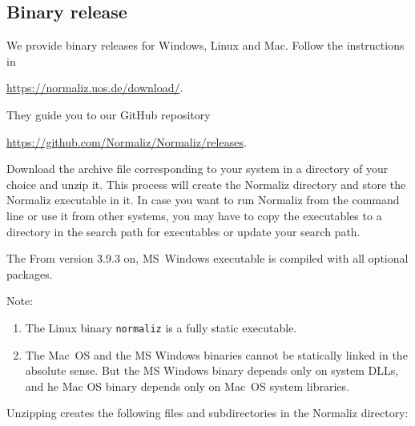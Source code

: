 \subsection{Binary release}\label{binary}

We provide binary releases for Windows, Linux and Mac. Follow the instructions in
\begin{center}
	\url{https://normaliz.uos.de/download/}.
\end{center}
They guide you to our GitHub repository
\begin{center}
	\url{https://github.com/Normaliz/Normaliz/releases}.
\end{center}

Download the archive file
corresponding to your system  in a directory of your choice
and unzip it. This process will create the Normaliz directory and store the Normaliz executable in it. In case you want to run Normaliz from the
command line or use it from other systems, you may have to copy
the executables to a directory in the search path for executables or update your search path.

The From version 3.9.3 on, MS~Windows executable is compiled with all optional packages.

Note:
\begin{enumerate}
\item The Linux binary \verb|normaliz| is a  fully static executable.
	
\item The Mac~OS and the MS Windows binaries cannot be statically linked in the absolute sense. But the MS Windows binary depends only on system DLLs, and he Mac OS  binary depends only on Mac~OS system libraries.

\end{enumerate}

Unzipping creates the following files and subdirectories in the Normaliz directory:

